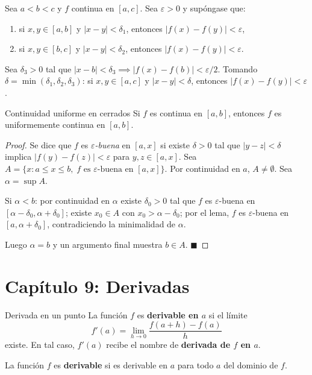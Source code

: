 \documentclass[12pt]{article}
\begin{document}
\begin{lema}[]{}
Sea $a < b < c$ y $f$ continua en $[a, c]$. Sea $\varepsilon > 0$ y supóngase que:
\begin{enumerate}
  \item[(i)] si $x, y \in [a, b]$ y $|x-y| < \delta_1$, entonces $|f(x)-f(y)| < \varepsilon$,
  \item[(ii)] si $x, y \in [b, c]$ y $|x-y| < \delta_2$, entonces $|f(x)-f(y)| < \varepsilon$.
\end{enumerate}
Sea $\delta_3 > 0$ tal que $|x-b| < \delta_3 \implies |f(x)-f(b)| < \varepsilon/2$. Tomando $\delta = \min(\delta_1, \delta_2, \delta_3)$: si $x, y \in [a,c]$ y $|x-y| < \delta$, entonces $|f(x)-f(y)| < \varepsilon$.
\end{lema}

\begin{teorema}[1]{Continuidad uniforme en cerrados}
Si $f$ es continua en $[a, b]$, entonces $f$ es uniformemente continua en $[a, b]$.
\end{teorema}

\begin{proof}
Se dice que $f$ es \textit{$\varepsilon$-buena} en $[a, x]$ si existe $\delta > 0$ tal que $|y - z| < \delta$ implica $|f(y) - f(z)| < \varepsilon$ para $y, z \in [a, x]$. Sea $A = \{x : a \leq x \leq b, \; f \text{ es $\varepsilon$-buena en } [a,x]\}$. Por continuidad en $a$, $A \neq \emptyset$. Sea $\alpha = \sup A$.

Si $\alpha < b$: por continuidad en $\alpha$ existe $\delta_0 > 0$ tal que $f$ es $\varepsilon$-buena en $[\alpha - \delta_0, \alpha + \delta_0]$; existe $x_0 \in A$ con $x_0 > \alpha - \delta_0$; por el lema, $f$ es $\varepsilon$-buena en $[a, \alpha + \delta_0]$, contradiciendo la minimalidad de $\alpha$.

Luego $\alpha = b$ y un argumento final muestra $b \in A$.
$\blacksquare$
\end{proof}

\section{Capítulo 9: Derivadas}

\begin{definicion}[]{Derivada en un punto}
La función $f$ es \textbf{derivable en $a$} si el límite
\[ f'(a) = \lim_{h \to 0} \frac{f(a+h) - f(a)}{h} \]
existe. En tal caso, $f'(a)$ recibe el nombre de \textbf{derivada de $f$ en $a$}.

La función $f$ es \textbf{derivable} si es derivable en $a$ para todo $a$ del dominio de $f$.
\end{definicion}
\end{document}
